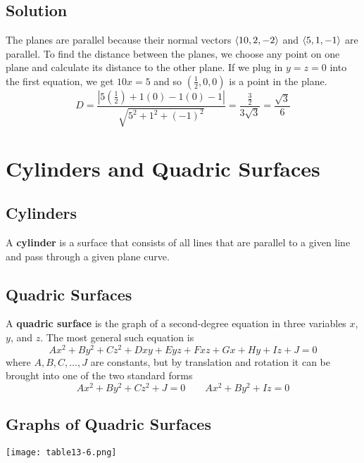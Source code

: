 \subsection*{Solution}
The planes are parallel because their normal vectors $\ev{10,2,-2}$ and
$\ev{5,1,-1}$ are parallel. To find the distance between the planes, we choose
any point on one plane and calculate its distance to the other plane. If we
plug in $y=z=0$ into the first equation, we get $10x=5$ and so $(\frac{1}{2},0,0)$
is a point in the plane.
$$D=\frac{|5(\frac{1}{2})+1(0)-1(0)-1|}{\sqrt{5^2+1^2+(-1)^2}}=\frac{\frac{3}{2}}{3\sqrt{3}}
    =\frac{\sqrt{3}}{6}$$

\section{Cylinders and Quadric Surfaces}

\subsection*{Cylinders}
A \textbf{cylinder} is a surface that consists of all lines that are parallel to a
given line and pass through a given plane curve.

\subsection*{Quadric Surfaces}
A \textbf{quadric surface} is the graph of a second-degree equation in three variables
$x$, $y$, and $z$. The most general such equation is
$$Ax^2+By^2+Cz^2+Dxy+Eyz+Fxz+Gx+Hy+Iz+J=0$$
where $A, B, C, \dots , J$ are constants, but by translation and rotation it can be
brought into one of the two standard forms
$$Ax^2+By^2+Cz^2+J=0 \qquad Ax^2+By^2+Iz=0$$

\subsection*{Graphs of Quadric Surfaces}
\begin{center}
    \texttt{[image: table13-6.png]}
\end{center}